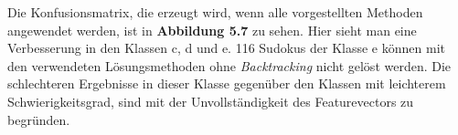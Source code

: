 \noindent Die Konfusionsmatrix, die erzeugt wird, wenn alle vorgestellten Methoden angewendet werden, ist in \textbf{Abbildung 5.7} zu sehen. Hier sieht man eine Verbesserung in den Klassen c, d und e. 116 Sudokus der Klasse e können mit den verwendeten Lösungsmethoden ohne \textit{Backtracking} nicht gelöst werden. Die schlechteren Ergebnisse in dieser Klasse gegenüber den Klassen mit leichterem Schwierigkeitsgrad, sind mit der Unvollständigkeit des Featurevectors zu begründen.
